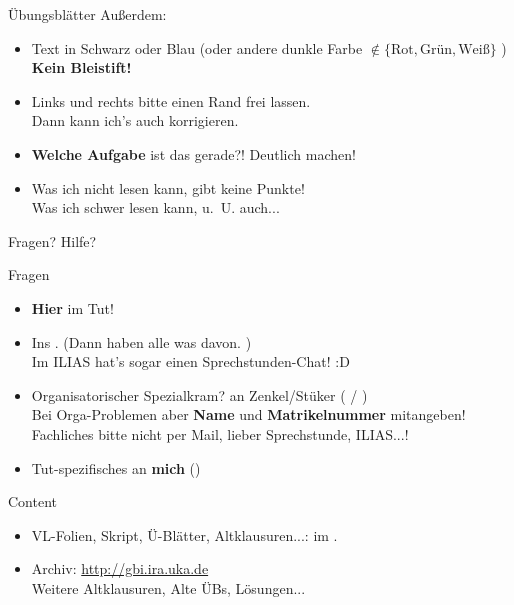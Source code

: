 \begin{frame}{Übungsblätter}
	Außerdem:
	\begin{itemize}
		\item Text in Schwarz oder Blau (oder andere dunkle Farbe $\notin \{\text{Rot}, \text{Grün}, \text{Weiß}\}$ ) \\
			  \textbf{Kein Bleistift!}
		\item Links und rechts bitte einen Rand frei lassen. \\
			  Dann kann ich's auch korrigieren. \smiley
		\item \textbf{Welche Aufgabe} ist das gerade?! \impl Deutlich machen!
		\item Was ich nicht lesen kann, gibt keine Punkte! \\
			  \small Was ich schwer lesen kann, u.~U. auch... 
	\end{itemize}
\end{frame}



\begin{frame}{Fragen? Hilfe?}	
	\begin{block}{Fragen}
		\begin{itemize}
			\item \textbf{Hier} im Tut!
			\item Ins \ILIAS. (Dann haben alle was davon. \smiley) \\
				  Im ILIAS hat's sogar einen Sprechstunden-Chat! :D
			\pause
			\item Organisatorischer Spezialkram? \impl an Zenkel/Stüker ( / ) \\
			Bei Orga-Problemen aber \textbf{Name} und \textbf{Matrikelnummer}  mitangeben! \\
			Fachliches bitte nicht per Mail, lieber \impl Sprechstunde, ILIAS...!
			\item Tut-spezifisches an \textbf{mich} (\mailto{\mymail})
		\end{itemize}
	\end{block}
	\pause
	\begin{block}{Content}
		\begin{itemize}
			\item VL-Folien, Skript, Ü-Blätter, Altklausuren...: im \ILIAS.
			\item Archiv: \url{http://gbi.ira.uka.de} \\
			Weitere Altklausuren, Alte ÜBs, Lösungen...
		\end{itemize}
	\end{block}
\end{frame}

